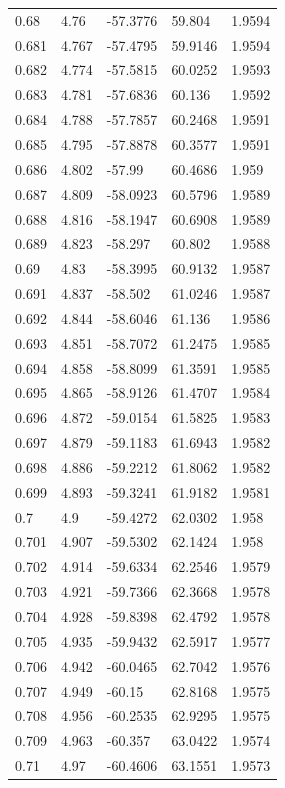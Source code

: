 \begin{tabular}{lllll}
0.68 & 4.76 & -57.3776 & 59.804 & 1.9594 \\
0.681 & 4.767 & -57.4795 & 59.9146 & 1.9594 \\
0.682 & 4.774 & -57.5815 & 60.0252 & 1.9593 \\
0.683 & 4.781 & -57.6836 & 60.136 & 1.9592 \\
0.684 & 4.788 & -57.7857 & 60.2468 & 1.9591 \\
0.685 & 4.795 & -57.8878 & 60.3577 & 1.9591 \\
0.686 & 4.802 & -57.99 & 60.4686 & 1.959 \\
0.687 & 4.809 & -58.0923 & 60.5796 & 1.9589 \\
0.688 & 4.816 & -58.1947 & 60.6908 & 1.9589 \\
0.689 & 4.823 & -58.297 & 60.802 & 1.9588 \\
0.69 & 4.83 & -58.3995 & 60.9132 & 1.9587 \\
0.691 & 4.837 & -58.502 & 61.0246 & 1.9587 \\
0.692 & 4.844 & -58.6046 & 61.136 & 1.9586 \\
0.693 & 4.851 & -58.7072 & 61.2475 & 1.9585 \\
0.694 & 4.858 & -58.8099 & 61.3591 & 1.9585 \\
0.695 & 4.865 & -58.9126 & 61.4707 & 1.9584 \\
0.696 & 4.872 & -59.0154 & 61.5825 & 1.9583 \\
0.697 & 4.879 & -59.1183 & 61.6943 & 1.9582 \\
0.698 & 4.886 & -59.2212 & 61.8062 & 1.9582 \\
0.699 & 4.893 & -59.3241 & 61.9182 & 1.9581 \\
0.7 & 4.9 & -59.4272 & 62.0302 & 1.958 \\
0.701 & 4.907 & -59.5302 & 62.1424 & 1.958 \\
0.702 & 4.914 & -59.6334 & 62.2546 & 1.9579 \\
0.703 & 4.921 & -59.7366 & 62.3668 & 1.9578 \\
0.704 & 4.928 & -59.8398 & 62.4792 & 1.9578 \\
0.705 & 4.935 & -59.9432 & 62.5917 & 1.9577 \\
0.706 & 4.942 & -60.0465 & 62.7042 & 1.9576 \\
0.707 & 4.949 & -60.15 & 62.8168 & 1.9575 \\
0.708 & 4.956 & -60.2535 & 62.9295 & 1.9575 \\
0.709 & 4.963 & -60.357 & 63.0422 & 1.9574 \\
0.71 & 4.97 & -60.4606 & 63.1551 & 1.9573 \\

\end{tabular}
